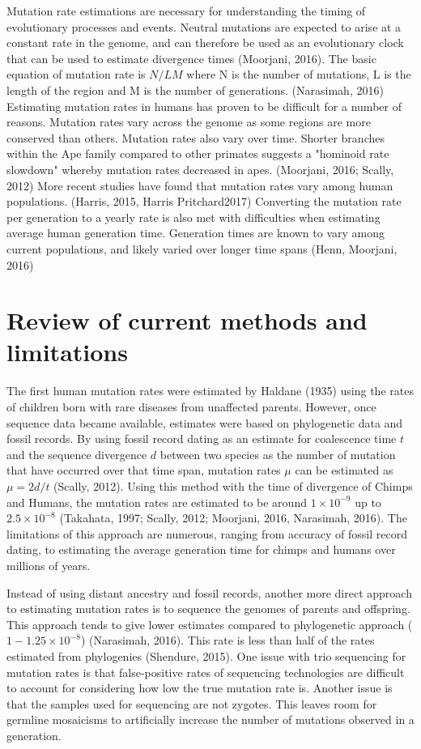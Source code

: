 \documentclass[
11pt, %
oneside, %
english, %
doublespacing, %
headsepline, %
]{MastersDoctoralThesis} %
\begin{document}
Mutation rate estimations are necessary for understanding the timing of evolutionary processes and events.
Neutral mutations are expected to arise at a constant rate in the genome, and can therefore be used as an evolutionary clock that can be used to estimate divergence times (Moorjani, 2016). 
The basic equation of mutation rate is $N / LM$ where N is the number of mutations, L is the length of the region and M is the number of generations. (Narasimah, 2016)
Estimating mutation rates in humans has proven to be difficult for a number of reasons.
Mutation rates vary across the genome as some regions are more conserved than others. 
Mutation rates also vary over time.
Shorter branches within the Ape family compared to other primates suggests a "hominoid rate slowdown" whereby mutation rates decreased in apes. (Moorjani, 2016; Scally, 2012)
More recent studies have found that mutation rates vary among human populations. (Harris, 2015, Harris Pritchard2017)
Converting the mutation rate per generation to a yearly rate is also met with difficulties when estimating average human generation time.
Generation times are known to vary among current populations, and likely varied over longer time spans (Henn, Moorjani, 2016)

\section{Review of current methods and limitations}

The first human mutation rates were estimated by Haldane (1935) using the rates of children born with rare diseases from unaffected parents.
However, once sequence data became available, estimates were based on phylogenetic data and fossil records.
By using fossil record dating as an estimate for coalescence time $t$ and the sequence divergence $d$ between two species as the number of mutation that have occurred over that time span, mutation rates $\mu$ can be estimated as $\mu = 2d/t$ (Scally, 2012). 
Using this method with the time of divergence of Chimps and Humans, the mutation rates are estimated to be around $1\times10^{-9}$ up to $2.5\times10^{-8}$ (Takahata, 1997; Scally, 2012; Moorjani, 2016, Narasimah, 2016).
The limitations of this approach are numerous, ranging from accuracy of fossil record dating, to estimating the average generation time for chimps and humans over millions of years.

Instead of using distant ancestry and fossil records, another more direct approach to estimating mutation rates is to sequence the genomes of parents and offspring. 
This approach tends to give lower estimates compared to phylogenetic approach ($1-1.25\times10^{-8}$) (Narasimah, 2016).
This rate is less than half of the rates estimated from phylogenies (Shendure, 2015). 
One issue with trio sequencing for mutation rates is that false-positive rates of sequencing technologies are difficult to account for considering how low the true mutation rate is.
Another issue is that the samples used for sequencing are not zygotes.
This leaves room for germline mosaicisms to artificially increase the number of mutations observed in a generation.
\end{document}
